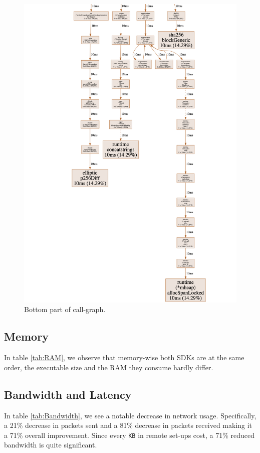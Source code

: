 \begin{figure}[h]
    \centering
    \includegraphics[width=1\textwidth]{images/6_performance/pi-cpu-call-bottom.png}
    \caption{Bottom part of call-graph.}
    \label{fig:cpu-prof-call-bottom}
\end{figure}

\subsection{Memory}
In table \ref{tab:RAM}, we observe that memory-wise both SDKs are at the same order, the executable size and the RAM they consume hardly differ.

\subsection{Bandwidth and Latency}
In table \ref{tab:Bandwidth}, we see a notable decrease in network usage. Specifically, a 21\% decrease in packets sent and a 81\% decrease in packets received making it a 71\% overall improvement. Since every \verb|KB| in remote set-ups cost, a 71\% reduced bandwidth is quite significant.
